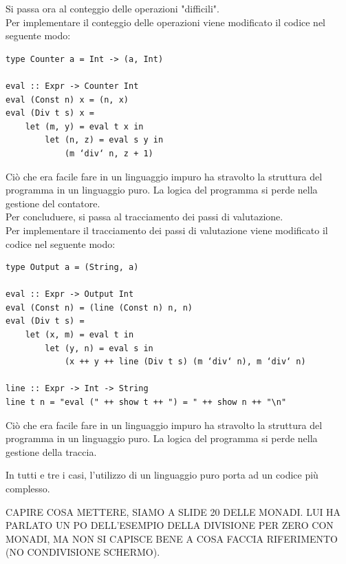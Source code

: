 \documentclass{article}
\begin{document}
\pagebreak

Si passa ora al conteggio delle operazioni "difficili".\\
Per implementare il conteggio delle operazioni viene modificato il codice nel seguente modo:
\begin{tcolorbox}
\begin{verbatim}
type Counter a = Int -> (a, Int)

eval :: Expr -> Counter Int
eval (Const n) x = (n, x)
eval (Div t s) x =
    let (m, y) = eval t x in
        let (n, z) = eval s y in
            (m ‘div‘ n, z + 1)
\end{verbatim}
\end{tcolorbox}
Ciò che era facile fare in un linguaggio impuro ha stravolto la struttura del programma in un linguaggio puro. La logica del programma si perde nella gestione del contatore.\vspace{14pt}\\
Per concluduere, si passa al tracciamento dei passi di valutazione.\\
Per implementare il tracciamento dei passi di valutazione viene modificato il codice nel seguente modo:
\begin{tcolorbox}
\begin{verbatim}
type Output a = (String, a)

eval :: Expr -> Output Int
eval (Const n) = (line (Const n) n, n)
eval (Div t s) =
    let (x, m) = eval t in
        let (y, n) = eval s in
            (x ++ y ++ line (Div t s) (m ‘div‘ n), m ‘div‘ n)

line :: Expr -> Int -> String
line t n = "eval (" ++ show t ++ ") = " ++ show n ++ "\n"
\end{verbatim}
\end{tcolorbox}
Ciò che era facile fare in un linguaggio impuro ha stravolto la struttura del programma in un linguaggio puro. La logica del programma si perde nella gestione della traccia.

In tutti e tre i casi, l'utilizzo di un linguaggio puro porta ad un codice più complesso.

CAPIRE COSA METTERE, SIAMO A SLIDE 20 DELLE MONADI. LUI HA PARLATO UN PO DELL'ESEMPIO DELLA DIVISIONE PER ZERO CON MONADI, MA NON SI CAPISCE BENE A COSA FACCIA RIFERIMENTO (NO CONDIVISIONE SCHERMO).
\end{document}
